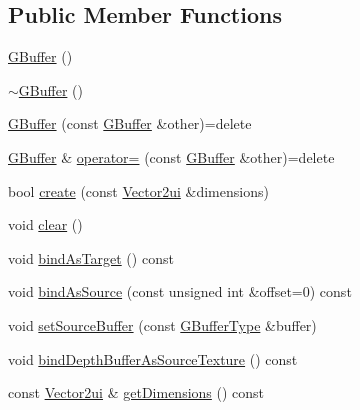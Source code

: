 \subsection*{Public Member Functions}
\begin{DoxyCompactItemize}
\item 
\hyperlink{classburn_1_1_g_buffer_a9a9c636a351dd22e437d6f336fb6a2a4}{G\-Buffer} ()
\item 
\hyperlink{classburn_1_1_g_buffer_ad41470d5488bd67dc1433b3bd79bf733}{$\sim$\-G\-Buffer} ()
\item 
\hyperlink{classburn_1_1_g_buffer_a957516476076372017261fadeb709ac3}{G\-Buffer} (const \hyperlink{classburn_1_1_g_buffer}{G\-Buffer} \&other)=delete
\item 
\hyperlink{classburn_1_1_g_buffer}{G\-Buffer} \& \hyperlink{classburn_1_1_g_buffer_a88e24c96ee82ba11a6cbf4f3dd6ae171}{operator=} (const \hyperlink{classburn_1_1_g_buffer}{G\-Buffer} \&other)=delete
\item 
bool \hyperlink{classburn_1_1_g_buffer_a39243a457ae9e41861f012af43c2cf43}{create} (const \hyperlink{namespaceburn_a6805fa33c49c4c3db88a7bebba2c408f}{Vector2ui} \&dimensions)
\item 
void \hyperlink{classburn_1_1_g_buffer_a9f2a284457cfbb0b77c126627a851a96}{clear} ()
\item 
void \hyperlink{classburn_1_1_g_buffer_a5c1388223d29e6e17a77e3337b8bca4b}{bind\-As\-Target} () const 
\item 
void \hyperlink{classburn_1_1_g_buffer_afdf4a06f333e49be232052f47c94deda}{bind\-As\-Source} (const unsigned int \&offset=0) const 
\item 
void \hyperlink{classburn_1_1_g_buffer_a38559f61010523ff60e7bc1ea29503d8}{set\-Source\-Buffer} (const \hyperlink{classburn_1_1_g_buffer_a27671ebfd5462ecc1fdf0dd46ca8054e}{G\-Buffer\-Type} \&buffer)
\item 
void \hyperlink{classburn_1_1_g_buffer_abf9bef0f8e595c11a4d752ad3e97761d}{bind\-Depth\-Buffer\-As\-Source\-Texture} () const 
\item 
const \hyperlink{namespaceburn_a6805fa33c49c4c3db88a7bebba2c408f}{Vector2ui} \& \hyperlink{classburn_1_1_g_buffer_aaf687ce69256d3307926ec2531c11fcd}{get\-Dimensions} () const 
\end{DoxyCompactItemize}



